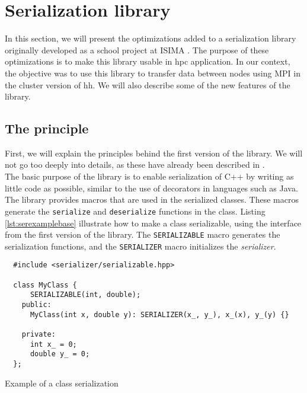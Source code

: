 
\clearpage{}
\section{Serialization library}

In this section, we will present the optimizations added to a serialization
library originally developed as a school project at ISIMA
\cite{projectzz3isima}. The purpose of these optimizations is to make this
library usable in \gls{hpc} application. In our context, the objective was to
use this library to transfer data between nodes using MPI in the cluster
version of \gls{hh}. We will also describe some of the new features of the
library.

\subsection{The principle}

First, we will explain the principles behind the first version of the
library. We will not go too deeply into details, as these have already been
described in \cite{projectzz3isima}.\\

The basic purpose of the library is to enable serialization of C++ by writing as
little code as possible, similar to the use of decorators in languages such as
Java. The library provides macros that are used in the serialized classes. These
macros generate the \texttt{serialize} and \texttt{deserialize} functions in the
class. Listing \ref{lst:serexamplebase} illustrate how to make a class
serializable, using the interface from the first version of the library. The
\texttt{SERIALIZABLE} macro generates the serialization functions, and the
\texttt{SERIALIZER} macro initializes the \textit{serializer}.

\begin{listing}[ht!]
\begin{verbatim}
  #include <serializer/serializable.hpp>

  class MyClass {
      SERIALIZABLE(int, double);
    public:
      MyClass(int x, double y): SERIALIZER(x_, y_), x_(x), y_(y) {}

    private:
      int x_ = 0;
      double y_ = 0;
  };
\end{verbatim}
\caption{Example of a class serialization}
\label{lst:serexamplebase}
\end{listing}

